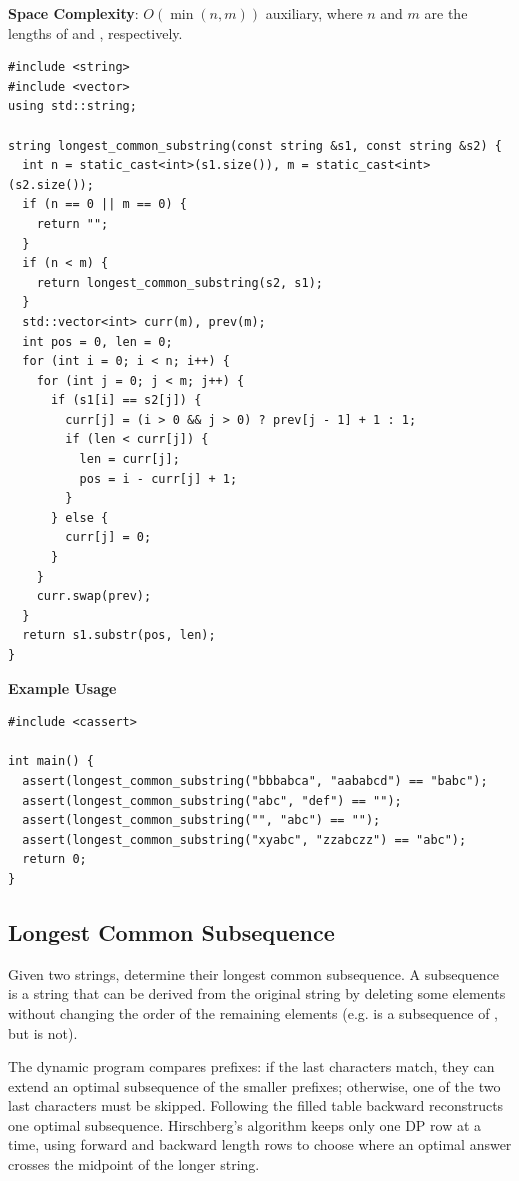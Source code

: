 \textbf{Space Complexity}: $O(\min\left(n, m\right))$ auxiliary, where $n$ and $m$ are the lengths of  and , respectively.

\begin{lstlisting}[style=cpp]
#include <string>
#include <vector>
using std::string;

string longest_common_substring(const string &s1, const string &s2) {
  int n = static_cast<int>(s1.size()), m = static_cast<int>(s2.size());
  if (n == 0 || m == 0) {
    return "";
  }
  if (n < m) {
    return longest_common_substring(s2, s1);
  }
  std::vector<int> curr(m), prev(m);
  int pos = 0, len = 0;
  for (int i = 0; i < n; i++) {
    for (int j = 0; j < m; j++) {
      if (s1[i] == s2[j]) {
        curr[j] = (i > 0 && j > 0) ? prev[j - 1] + 1 : 1;
        if (len < curr[j]) {
          len = curr[j];
          pos = i - curr[j] + 1;
        }
      } else {
        curr[j] = 0;
      }
    }
    curr.swap(prev);
  }
  return s1.substr(pos, len);
}
\end{lstlisting}
\textbf{Example Usage}\par
\begin{lstlisting}[style=cpp]
#include <cassert>

int main() {
  assert(longest_common_substring("bbbabca", "aababcd") == "babc");
  assert(longest_common_substring("abc", "def") == "");
  assert(longest_common_substring("", "abc") == "");
  assert(longest_common_substring("xyabc", "zzabczz") == "abc");
  return 0;
}
\end{lstlisting}
\subsection{Longest Common Subsequence}
\label{sec:3.6.2}
Given two strings, determine their longest common subsequence. A subsequence is a string that can be derived from the original string by deleting some elements without changing the order of the remaining elements (e.g.  is a subsequence of , but  is not).

The dynamic program compares prefixes: if the last characters match, they can extend an optimal subsequence of the smaller prefixes; otherwise, one of the two last characters must be skipped. Following the filled table backward reconstructs one optimal subsequence. Hirschberg's algorithm keeps only one DP row at a time, using forward and backward length rows to choose where an optimal answer crosses the midpoint of the longer string.

